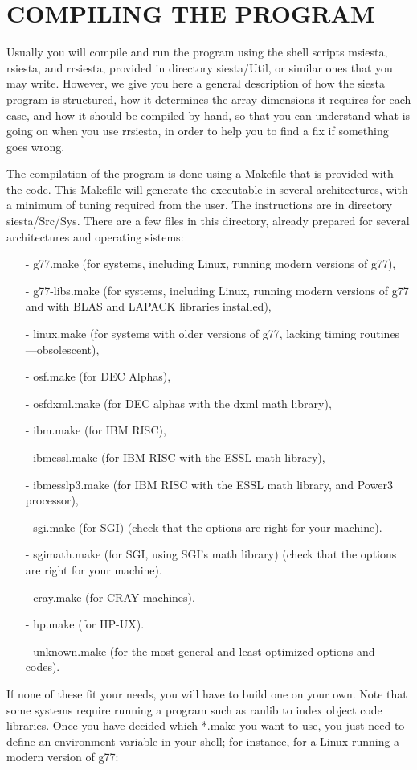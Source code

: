 \section{COMPILING THE PROGRAM}

Usually you will compile and run the program using the
shell scripts msiesta, rsiesta, and rrsiesta, provided in
directory siesta/Util, or similar ones that you may write.
However, we give you here a general description of how
the siesta program is structured, how it determines the
array dimensions it requires for each case, and how it
should be compiled by hand, so that you can understand
what is going on when you use rrsiesta, in order to help
you to find a fix if something goes wrong.

The compilation of the program is done using a Makefile
that is provided with the code.
This Makefile will generate the executable in several
architectures, with a  minimum of tuning required from the
user. The instructions are in directory siesta/Src/Sys.
There are a few files  in this directory,
already prepared for several architectures and
operating sistems: 
\begin{itemize}
\item[-] g77.make (for systems, including Linux, running modern
versions of g77),
\item[-] g77-libs.make (for systems, including Linux, running modern
versions of g77 and with BLAS and LAPACK libraries installed),
\item[-] linux.make (for systems with older versions of g77, lacking
timing routines ---obsolescent),
\item[-] osf.make (for DEC Alphas), 
\item[-] osfdxml.make (for DEC alphas with the dxml math library), 
\item[-] ibm.make (for IBM RISC), 
\item[-] ibmessl.make (for IBM RISC with the ESSL math library), 
\item[-] ibmesslp3.make (for IBM RISC with the ESSL math library, and
Power3 processor),
\item[-] sgi.make (for SGI) 
      (check that the options are right for your machine).
\item[-] sgimath.make (for SGI, using SGI's math library) 
      (check that the options are right for your machine).
\item[-] cray.make (for CRAY machines).
\item[-] hp.make (for HP-UX).
\item[-] unknown.make (for the most general and least optimized 
options and codes).
\end{itemize}
\noindent
If none of these fit your needs, you will have to build
one on your own. Note that some systems require running a program such as
ranlib to index object code libraries.
Once you have decided which *.make you want to use,
you just need to define an environment variable
in your shell; for instance, for a Linux running a modern version of
g77:

